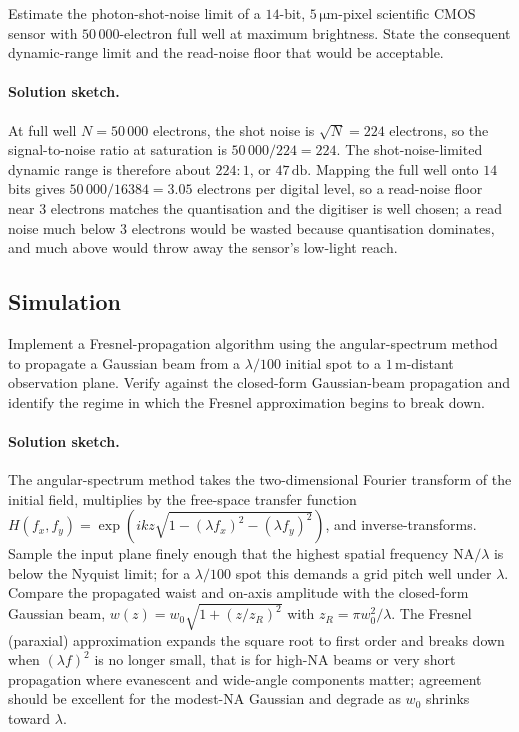 \begin{exercise}
Estimate the photon-shot-noise limit of a $14$-bit, $5\,\si{\micro
\meter}$-pixel scientific CMOS sensor with $50\,000$-electron full
well at maximum brightness. State the consequent dynamic-range
limit and the read-noise floor that would be acceptable.
\paragraph{Solution sketch.} At full well $N = 50\,000$ electrons, the
shot noise is $\sqrt{N} = 224$ electrons, so the signal-to-noise ratio
at saturation is $50\,000/224 = 224$. The shot-noise-limited dynamic
range is therefore about $224{:}1$, or $47\,\si{\decibel}$. Mapping the
full well onto $14$ bits gives $50\,000/16384 = 3.05$ electrons per
digital level, so a read-noise floor near $3$ electrons matches the
quantisation and the digitiser is well chosen; a read noise much below
$3$ electrons would be wasted because quantisation dominates, and much
above would throw away the sensor's low-light reach.
\end{exercise}

\subsection*{Simulation}

\begin{exercise}
Implement a Fresnel-propagation algorithm using the
angular-spectrum method to propagate a Gaussian beam from a $\lambda
/100$ initial spot to a $1\,\si{\meter}$-distant observation plane.
Verify against the closed-form Gaussian-beam propagation and
identify the regime in which the Fresnel approximation begins to
break down.
\paragraph{Solution sketch.} The angular-spectrum method takes the
two-dimensional Fourier transform of the initial field, multiplies by
the free-space transfer function $H(f_{x},f_{y}) = \exp(i k z
\sqrt{1 - (\lambda f_{x})^{2} - (\lambda f_{y})^{2}})$, and
inverse-transforms. Sample the input plane finely enough that the
highest spatial frequency $\text{NA}/\lambda$ is below the Nyquist
limit; for a $\lambda/100$ spot this demands a grid pitch well under
$\lambda$. Compare the propagated waist and on-axis amplitude with the
closed-form Gaussian beam, $w(z) = w_{0}\sqrt{1 + (z/z_{R})^{2}}$ with
$z_{R} = \pi w_{0}^{2}/\lambda$. The Fresnel (paraxial) approximation
expands the square root to first order and breaks down when
$(\lambda f)^{2}$ is no longer small, that is for high-NA beams or very
short propagation where evanescent and wide-angle components matter;
agreement should be excellent for the modest-NA Gaussian and degrade as
$w_{0}$ shrinks toward $\lambda$.
\end{exercise}


